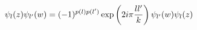 \begin{equation}
\psi_l(z)\psi_{l'}(w)=(-1)^{p(l)p(l')} \exp\left(2i\pi {ll'\over
    k}\right) \psi_{l'}(w)\psi_l(z)
\end{equation}

